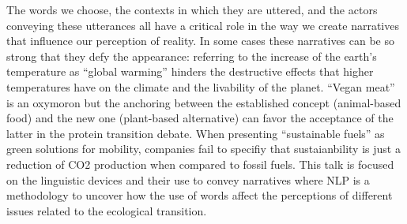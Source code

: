 The words we choose, the contexts in which they are uttered, and the actors conveying these utterances all have a critical role in the way we create narratives that influence our perception of reality. In some cases these narratives can be so strong that they defy the appearance: referring to the increase of the earth’s temperature as “global warming” hinders the destructive effects that higher temperatures have on the climate and the livability of the planet. “Vegan meat” is an oxymoron but the anchoring between the established concept (animal-based food) and the new one (plant-based alternative) can favor the acceptance of the latter in the protein transition debate. When presenting “sustainable fuels” as green solutions for mobility, companies fail to specifiy that sustaianbility is just a reduction of CO2 production when compared to fossil fuels. This talk is focused on the linguistic devices and their use to convey narratives where NLP is a methodology to uncover how the use of words affect the perceptions of different issues related to the ecological transition.